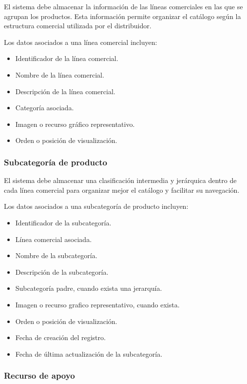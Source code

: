 El sistema debe almacenar la información de las líneas comerciales en las que se agrupan los productos. Esta información permite organizar el catálogo según la estructura comercial utilizada por el distribuidor.

Los datos asociados a una línea comercial incluyen:

\begin{itemize}
    \item Identificador de la línea comercial.
    \item Nombre de la línea comercial.
    \item Descripción de la línea comercial.
    \item Categoría asociada.
    \item Imagen o recurso gráfico representativo.
    \item Orden o posición de visualización.
\end{itemize}

\subsubsection*{Subcategoría de producto}

El sistema debe almacenar una clasificación intermedia y jerárquica dentro de cada línea comercial para organizar mejor el catálogo y facilitar su navegación.

Los datos asociados a una subcategoría de producto incluyen:

\begin{itemize}
    \item Identificador de la subcategoría.
    \item Línea comercial asociada.
    \item Nombre de la subcategoría.
    \item Descripción de la subcategoría.
    \item Subcategoría padre, cuando exista una jerarquía.
    \item Imagen o recurso grafico representativo, cuando exista.
    \item Orden o posición de visualización.
    \item Fecha de creación del registro.
    \item Fecha de última actualización de la subcategoría.
\end{itemize}

\subsubsection*{Recurso de apoyo}

